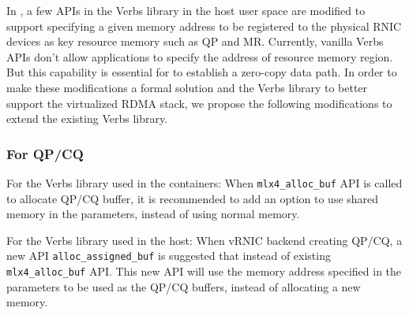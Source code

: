 

In \sys, a few APIs in the Verbs library in the host user space are modified to support specifying a given memory address to be registered to the physical RNIC devices as key resource memory such as QP and MR. Currently, vanilla Verbs APIs don't allow applications to specify the address of resource memory region. But this capability is essential for \sys to establish a zero-copy data path.
In order to make these modifications a formal solution and the Verbs library to better support the virtualized RDMA stack, we propose the following modifications to extend the existing Verbs library.


\subsubsection{For QP/CQ}
For the Verbs library used in the containers: When \texttt{mlx4\_alloc\_buf} API is called to allocate QP/CQ buffer, it is recommended to add an option to use shared memory in the parameters, instead of using normal memory.

For the Verbs library used in the host: When vRNIC backend creating QP/CQ, a new API \texttt{alloc\_assigned\_buf} is suggested that instead of existing \texttt{mlx4\_alloc\_buf} API. This new API will use the memory address specified in the parameters to be used as the QP/CQ buffers, instead of allocating a new memory.



